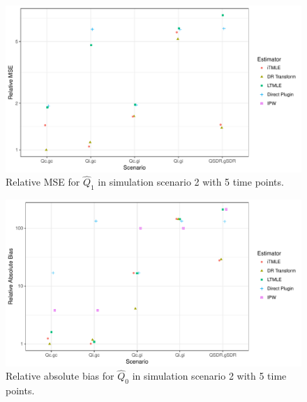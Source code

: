 \documentclass{article}\usepackage[]{graphicx}\usepackage[]{color}
\newenvironment{knitrout}{}{} %
\begin{document}
\begin{knitrout}
\color{fgcolor}\begin{figure}[H]

{\centering \includegraphics[width=.7\linewidth]{figure/plot-ggplot_MSE_t5-1} 

}

\caption[Relative MSE for $\hat{Q}_1$ in simulation scenario 2 with 5 time points]{Relative MSE for $\hat{Q}_1$ in simulation scenario 2 with 5 time points.}\label{fig:ggplot.MSE.t5}
\end{figure}


\end{knitrout}

\begin{knitrout}
\color{fgcolor}\begin{figure}[H]

{\centering \includegraphics[width=.7\linewidth]{figure/plot-ggplot_bias_t5-1} 

}

\caption[Relative absolute bias for $\hat{Q}_0$ in simulation scenario 2 with 5 time points]{Relative absolute bias for $\hat{Q}_0$ in simulation scenario 2 with 5 time points.}\label{fig:ggplot.bias.t5}
\end{figure}


\end{knitrout}
\end{document}
